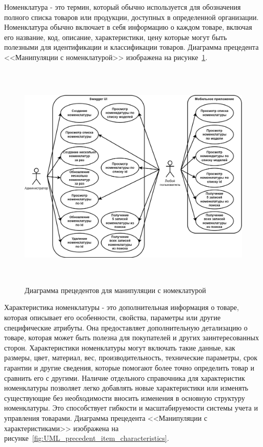 Номенклатура - это термин, который обычно используется для обозначения полного списка товаров или продукции,
доступных в определенной организации.
Номенклатура обычно включает в себя информацию о каждом товаре, включая его название, код, описание, характеристики, цену
которые могут быть полезными для идентификации и классификации товаров.
Диаграмма прецедента <<Манипуляции с номенклатурой>> изображена на рисунке~\ref{fig:UML_precedent_items}.

\begin{figure}[!htb]
    \centering

    \includegraphics[height=11cm]
    {images/UML/UML_precedent_items.png}

    \caption{Диаграмма прецедентов для манипуляции с номеклатурой}

    \label{fig:UML_precedent_items}
\end{figure}

Характеристика номенклатуры - это дополнительная информация о товаре,
которая описывает его особенности, свойства, параметры или другие специфические атрибуты.
Она предоставляет дополнительную детализацию о товаре, которая может быть полезна для покупателей и других заинтересованных сторон.
Характеристики номенклатуры могут включать такие данные, как размеры, цвет, материал, вес, производительность, технические параметры, срок гарантии и другие сведения,
которые помогают более точно определить товар и сравнить его с другими.
Наличие отдельного справочника для характеристик номенклатуры позволяет легко добавлять новые характеристики
или изменять существующие без необходимости вносить изменения в основную структуру номенклатуры.
Это способствует гибкости и масштабируемости системы учета и управления товарами.
Диаграмма прецедента <<Манипуляции с характеристиками>> изображена на рисунке~\ref{fig:UML_precedent_item_characteristics}.

